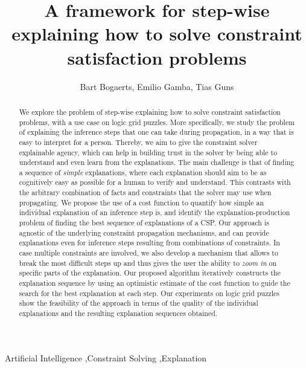 \documentclass[3p]{elsarticle}
\begin{document}
\begin{frontmatter}

\title{A framework for step-wise explaining how to solve constraint satisfaction problems}

\author[mymainaddress]{Bart Bogaerts, Emilio Gamba, Tias Guns}
\address{Vrije Universiteit Brussel, Pleinlaan 2, 1050 Brussel, Belgium}

\begin{abstract}
We explore the problem of step-wise explaining how to solve constraint satisfaction problems, with a use case on logic grid puzzles.
More specifically, we study the problem of explaining the inference steps that one can take during propagation, in a way that is easy to interpret for a person.
Thereby, we aim to give the constraint solver explainable agency, which can help in building trust in the solver by being able to understand and even learn from the explanations.
The main challenge is that of finding a sequence of \textit{simple} explanations, where each explanation should aim to be as cognitively easy as possible for a human to verify and understand. 
This contrasts with the arbitrary combination of facts and constraints that the solver may use when propagating.
We propose the use of a cost function to quantify how simple an individual explanation of an inference step is, and identify the explanation-production problem of finding the best sequence of explanations of a CSP. 
Our approach is agnostic of the underlying constraint propagation mechanisms, and can provide explanations even for inference steps resulting from combinations of constraints. 
In case multiple constraints are involved, we also develop a mechanism that allows to break the most difficult steps up and thus gives the user the ability to \emph{zoom in} on specific parts of the explanation. 
Our proposed algorithm iteratively constructs the explanation sequence by using an optimistic estimate of the cost function to guide the search for the best explanation at each step.
Our experiments on logic grid puzzles show the feasibility of the approach in terms of the quality of the individual explanations and the resulting explanation sequences obtained.
\end{abstract}

\begin{keyword}
Artificial Intelligence \sep Constraint Solving \sep Explanation
\end{keyword}

\end{frontmatter}
\end{document}
